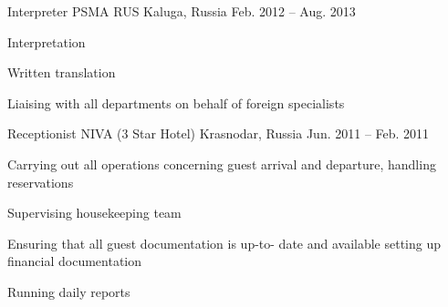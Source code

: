\begin{cventries}
  \cventry
    {Interpreter} %
    {PSMA RUS} %
    {Kaluga, Russia} %
    {Feb. 2012 -- Aug. 2013} %
    {
      \begin{cvitems} %
        \item {Interpretation}
        \item {Written translation}
        \item {Liaising with all departments on behalf of foreign specialists}
      \end{cvitems}
    }

  \cventry
    {Receptionist} %
    {NIVA (3 Star Hotel)} %
    {Krasnodar, Russia} %
    {Jun. 2011 -- Feb. 2011} %
    {
      \begin{cvitems} %
        \item {Carrying out all operations concerning guest arrival and departure, handling reservations}
        \item {Supervising housekeeping team}
        \item {Ensuring that all guest documentation is up-to- date and available setting up financial documentation}
        \item {Running daily reports}
      \end{cvitems}
    }

\end{cventries}
